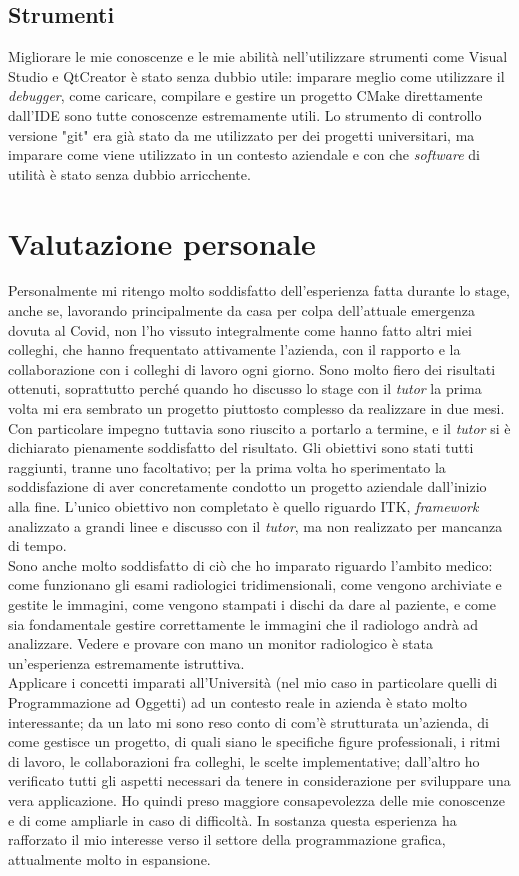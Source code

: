 \subsection{Strumenti}
Migliorare le mie conoscenze e le mie abilità nell'utilizzare strumenti come Visual Studio e QtCreator è stato senza dubbio utile: imparare meglio come utilizzare il \emph{debugger}, come caricare, compilare e gestire un progetto CMake direttamente dall'IDE sono tutte conoscenze estremamente utili. Lo strumento di controllo versione "git" era già stato da me utilizzato per dei progetti universitari, ma imparare come viene utilizzato in un contesto aziendale e con che \emph{software} di utilità è stato senza dubbio arricchente.

\section{Valutazione personale}
Personalmente mi ritengo molto soddisfatto dell'esperienza fatta durante lo stage, anche se, lavorando principalmente da casa per colpa dell'attuale emergenza dovuta al Covid, non l'ho vissuto integralmente come hanno fatto altri miei colleghi, che hanno frequentato attivamente l'azienda, con il rapporto e la collaborazione con i colleghi di lavoro ogni giorno. Sono molto fiero dei risultati ottenuti, soprattutto perché quando ho discusso lo stage con il \emph{tutor} la prima volta mi era sembrato un progetto piuttosto complesso da realizzare in due mesi. Con particolare impegno tuttavia sono riuscito a portarlo a termine, e il \emph{tutor} si è dichiarato pienamente soddisfatto del risultato. Gli obiettivi sono stati tutti raggiunti, tranne uno facoltativo; per la prima volta ho sperimentato la soddisfazione di aver concretamente condotto un progetto aziendale dall'inizio alla fine. L'unico obiettivo non completato è quello riguardo ITK, \emph{framework} analizzato a grandi linee e discusso con il \emph{tutor}, ma non realizzato per mancanza di tempo.
\\
Sono anche molto soddisfatto di ciò che ho imparato riguardo l'ambito medico: come funzionano gli esami radiologici tridimensionali, come vengono archiviate e gestite le immagini, come vengono stampati i dischi da dare al paziente, e come sia fondamentale gestire correttamente le immagini che il radiologo andrà ad analizzare. Vedere e provare con mano un monitor radiologico è stata un'esperienza estremamente istruttiva.
\\
Applicare i concetti imparati all'Università (nel mio caso in particolare quelli di
Programmazione ad Oggetti) ad un contesto reale in azienda è stato molto interessante;
da un lato mi sono reso conto di com'è strutturata un'azienda, di come gestisce un progetto, di quali siano le specifiche figure professionali, i ritmi di lavoro, le collaborazioni fra colleghi, le scelte implementative; dall'altro ho verificato tutti gli aspetti necessari da tenere in considerazione per sviluppare una vera applicazione. Ho quindi preso maggiore consapevolezza delle mie conoscenze e di come ampliarle in caso di difficoltà. In sostanza questa esperienza ha rafforzato il mio interesse verso il settore della programmazione grafica, attualmente molto in espansione.

